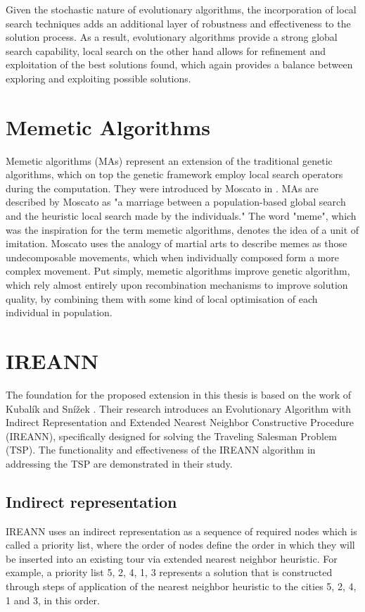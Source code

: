 \documentclass[twoside]{ctuthesis}
\theoremstyle{plain}
\theoremstyle{definition}
\theoremstyle{note}
\begin{document}
Given the stochastic nature of evolutionary algorithms, the incorporation of local search techniques adds an additional layer of robustness and effectiveness to the solution process. As a result, evolutionary algorithms provide a strong global search capability, local search on the other hand allows for refinement and exploitation of the best solutions found, which again provides a balance between exploring and exploiting possible solutions.

\section{Memetic Algorithms}
\label{sec:memetic}
Memetic algorithms (MAs) represent an extension of the traditional genetic algorithms, which on top the genetic framework employ local search operators during the computation. They were introduced by Moscato in \cite{moscato1989evolution}. MAs are described by Moscato as "a marriage between a population-based global search and the heuristic local search made by the individuals." The word "meme", which was the inspiration for the term memetic algorithms, denotes the idea of a unit of imitation. Moscato uses the analogy of martial arts to describe memes as those undecomposable movements, which when individually composed form a more complex movement. Put simply, memetic algorithms improve genetic algorithm, which rely almost entirely upon recombination mechanisms to improve solution quality, by combining them with some kind of local optimisation of each individual in population. 

\section{IREANN}
The foundation for the proposed extension in this thesis is based on the work of Kubalík and Snížek \cite{kubalik2014novel}. Their research introduces an Evolutionary Algorithm with Indirect Representation and Extended Nearest Neighbor Constructive Procedure (IREANN), specifically designed for solving the Traveling Salesman Problem (TSP). The functionality and effectiveness of the IREANN algorithm in addressing the TSP are demonstrated in their study.

\subsection{Indirect representation}
IREANN uses an indirect representation as a sequence of required nodes which is called a priority list, where the order of nodes define the order in which they will be inserted into an existing tour via extended nearest neighbor heuristic. For example, a priority list {5, 2, 4, 1, 3} represents a solution that is constructed through steps of application of the nearest neighbor heuristic to the cities 5, 2, 4, 1 and 3, in this order.
\end{document}
